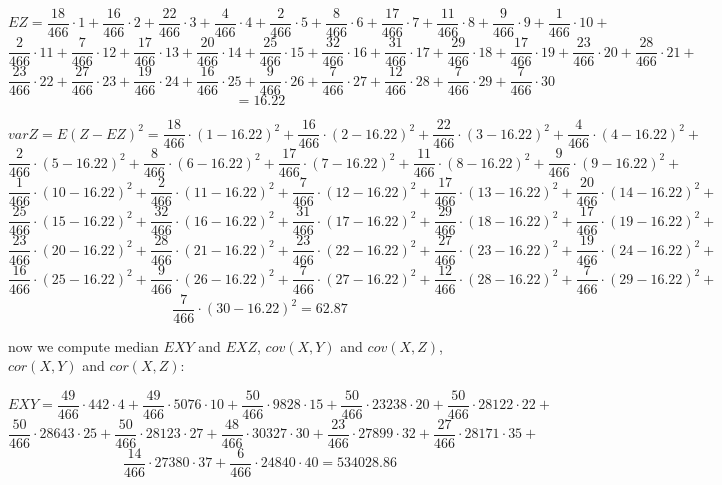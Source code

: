 \documentclass[11pt,twoside,a4paper]{book}
\begin{document}
$$EZ = \frac{18}{466}\cdot 1 + \frac{16}{466}\cdot 2 + \frac{22}{466}\cdot 3+
\frac{4}{466}\cdot4 + \frac{2}{466}\cdot5 + \frac{8}{466}\cdot6 +
\frac{17}{466}\cdot7+\frac{11}{466}\cdot8+\frac{9}{466}\cdot9+\frac{1}{466}\cdot10+$$
$$\frac{2}{466}\cdot11+\frac{7}{466}\cdot12+\frac{17}{466}\cdot13+\frac{20}{466}\cdot14+\frac{25}{466}\cdot15+\frac{32}{466}\cdot16+\frac{31}{466}\cdot17+\frac{29}{466}\cdot18+\frac{17}{466}\cdot19+\frac{23}{466}\cdot20+\frac{28}{466}\cdot21+$$
$$\frac{23}{466}\cdot22+\frac{27}{466}\cdot23+\frac{19}{466}\cdot24+\frac{16}{466}\cdot25+\frac{9}{466}\cdot26+\frac{7}{466}\cdot27+\frac{12}{466}\cdot28+\frac{7}{466}\cdot29+\frac{7}{466}\cdot30$$
$$=16.22$$






$$varZ=E(Z-EZ)^2=\frac{18}{466}\cdot \left(1 - 16.22\right)^2 +
\frac{16}{466}\cdot \left(2-16.22\right)^2 + \frac{22}{466}\cdot
\left(3-16.22\right)^2+ \frac{4}{466}\cdot\left(4-16.22\right)^2 +$$
$$\frac{2}{466}\cdot\left(5-16.22\right)^2 +\frac{8}{466}\cdot\left(6-16.22\right)^2 +
\frac{17}{466}\cdot\left(7-16.22\right)^2+\frac{11}{466}\cdot\left(8-16.22\right)^2+\frac{9}{466}\cdot\left(9-16.22\right)^2+$$
$$\frac{1}{466}\cdot\left(10-16.22\right)^2+\frac{2}{466}\cdot\left(11-16.22\right)^2+\frac{7}{466}\cdot\left(12-16.22\right)^2+\frac{17}{466}\cdot\left(13-16.22\right)^2+\frac{20}{466}\cdot\left(14-16.22\right)^2+$$
$$\frac{25}{466}\cdot\left(15-16.22\right)^2+\frac{32}{466}\cdot\left(16-16.22\right)^2+\frac{31}{466}\cdot\left(17-16.22\right)^2+\frac{29}{466}\cdot\left(18-16.22\right)^2+\frac{17}{466}\cdot\left(19-16.22\right)^2+$$
$$\frac{23}{466}\cdot\left(20-16.22\right)^2+\frac{28}{466}\cdot\left(21-16.22\right)^2+\frac{23}{466}\cdot\left(22-16.22\right)^2+\frac{27}{466}\cdot\left(23-16.22\right)^2+\frac{19}{466}\cdot\left(24-16.22\right)^2+$$
$$\frac{16}{466}\cdot\left(25-16.22\right)^2+\frac{9}{466}\cdot\left(26-16.22\right)^2+\frac{7}{466}\cdot\left(27-16.22\right)^2+\frac{12}{466}\cdot\left(28-16.22\right)^2+\frac{7}{466}\cdot\left(29-16.22\right)^2+$$
$$\frac{7}{466}\cdot\left(30-16.22\right)^2=62.87$$

 
now we compute median $EXY$ and $EXZ$, $cov(X,Y)$ and $cov(X,Z)$, $cor(X,Y)$
and $cor(X,Z)$:

$$EXY=\frac{49}{466}\cdot442\cdot 4
+\frac{49}{466}\cdot5076\cdot10+\frac{50}{466}\cdot9828
\cdot15+\frac{50}{466}\cdot23238\cdot20+\frac{50}{466}\cdot28122\cdot22+$$
$$\frac{50}{466}\cdot28643\cdot25+\frac{50}{466}\cdot28123\cdot27+\frac{48}{466}\cdot30327\cdot30+\frac{23}{466}\cdot27899\cdot32+\frac{27}{466}\cdot28171\cdot35+$$
$$\frac{14}{466}\cdot27380\cdot37+\frac{6}{466}\cdot24840\cdot40=534028.86$$
\end{document}
